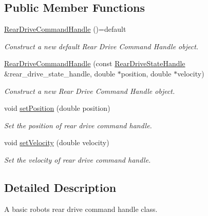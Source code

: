 \subsection*{Public Member Functions}
\begin{DoxyCompactItemize}
\item 
\mbox{\label{classhardware__interface_1_1RearDriveCommandHandle_ad3f05c6933b5dd9cf92e058cf62457a4}} 
\hyperlink{classhardware__interface_1_1RearDriveCommandHandle_ad3f05c6933b5dd9cf92e058cf62457a4}{Rear\+Drive\+Command\+Handle} ()=default
\begin{DoxyCompactList}\small\item\em Construct a new default Rear Drive Command Handle object. \end{DoxyCompactList}\item 
\hyperlink{classhardware__interface_1_1RearDriveCommandHandle_a4771ab2032a90b1d9de1f401f6404a3a}{Rear\+Drive\+Command\+Handle} (const \hyperlink{classhardware__interface_1_1RearDriveStateHandle}{Rear\+Drive\+State\+Handle} \&rear\+\_\+drive\+\_\+state\+\_\+handle, double $\ast$position, double $\ast$velocity)
\begin{DoxyCompactList}\small\item\em Construct a new Rear Drive Command Handle object. \end{DoxyCompactList}\item 
void \hyperlink{classhardware__interface_1_1RearDriveCommandHandle_ab1d0dad5cea8a38e1a3487de92ebd903}{set\+Position} (double position)
\begin{DoxyCompactList}\small\item\em Set the position of rear drive command handle. \end{DoxyCompactList}\item 
void \hyperlink{classhardware__interface_1_1RearDriveCommandHandle_a1a67757268ecfac2b02f22f686c94097}{set\+Velocity} (double velocity)
\begin{DoxyCompactList}\small\item\em Set the velocity of rear drive command handle. \end{DoxyCompactList}\end{DoxyCompactItemize}


\subsection{Detailed Description}
A basic robot\textquotesingle{}s rear drive command handle class. 

